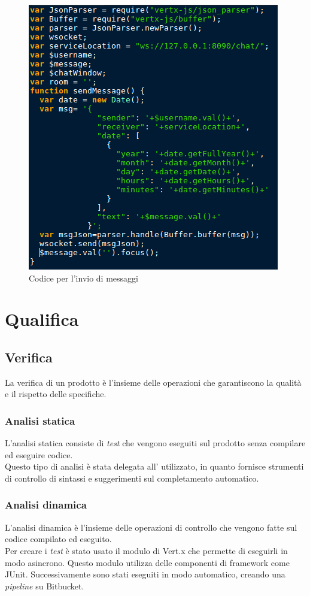         \begin{figure}[h]
          \centering
          \includegraphics[scale=0.5]{immagini/sendJS.png}
          \caption{Codice per l'invio di messaggi}
          \label{cod}
        \end{figure}
  \newpage
  \section{Qualifica}
    \subsection{Verifica}
      La verifica di un prodotto è l'insieme delle operazioni che garantiscono la qualità e il rispetto delle specifiche.
      \subsubsection{Analisi statica}
        L'analisi statica consiste di \textit{test} che vengono eseguiti sul prodotto senza compilare ed eseguire codice.\\
        Questo tipo di analisi è stata delegata all' utilizzato, in quanto fornisce strumenti di controllo di sintassi e suggerimenti sul completamento automatico.
      \subsubsection{Analisi dinamica}
        L'analisi dinamica è l'insieme delle operazioni di controllo che vengono fatte sul codice compilato ed eseguito.\\
        Per creare i \textit{test} è stato usato il modulo di Vert.x che permette di eseguirli in modo asincrono. Questo modulo utilizza delle componenti di framework come JUnit.
        Successivamente sono stati eseguiti in modo automatico, creando una \textit{pipeline} su Bitbucket.

